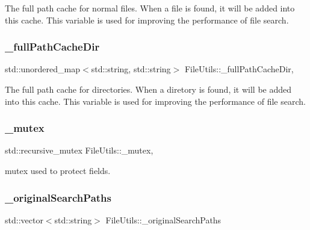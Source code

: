 The full path cache for normal files. When a file is found, it will be added into this cache. This variable is used for improving the performance of file search. \mbox{\label{classFileUtils_a1692ddcf7df153c024bfc3f0a3756fd8}} 
\subsubsection{\texorpdfstring{\+\_\+full\+Path\+Cache\+Dir}{\_fullPathCacheDir}}
{\footnotesize\ttfamily std\+::unordered\+\_\+map$<$std\+::string, std\+::string$>$ File\+Utils\+::\+\_\+full\+Path\+Cache\+Dir\hspace{0.3cm}{\ttfamily [mutable]}, {\ttfamily [protected]}}

The full path cache for directories. When a diretory is found, it will be added into this cache. This variable is used for improving the performance of file search. \mbox{\label{classFileUtils_a5a756383861bc8cf5058ac4253d269d7}} 
\subsubsection{\texorpdfstring{\+\_\+mutex}{\_mutex}}
{\footnotesize\ttfamily std\+::recursive\+\_\+mutex File\+Utils\+::\+\_\+mutex\hspace{0.3cm}{\ttfamily [mutable]}, {\ttfamily [protected]}}

mutex used to protect fields. \mbox{\label{classFileUtils_a1bd4771548f29716b5897cd7d4cc82f1}} 
\subsubsection{\texorpdfstring{\+\_\+original\+Search\+Paths}{\_originalSearchPaths}}
{\footnotesize\ttfamily std\+::vector$<$std\+::string$>$ File\+Utils\+::\+\_\+original\+Search\+Paths\hspace{0.3cm}{\ttfamily [protected]}}

